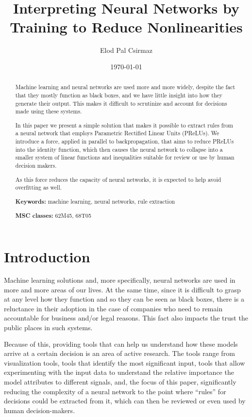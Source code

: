 \documentclass{article}[12pt]
\title{Interpreting Neural Networks by Training to Reduce Nonlinearities}
\author{Elod Pal Csirmaz\\
\texttt{\rot{\rot{maz.}{csir}{ep}com}{@}{elod}}}
\date{\today}
\newcommand{\myskip}{\bigskip\noindent}
\begin{document}
\maketitle

\begin{abstract}
Machine learning and neural networks are used more and more widely,
despite the fact that they mostly function as black boxes, and we
have little insight into how they generate their output.
This makes it difficult to scrutinize and account for decisions made using these systems.

In this paper we present a simple solution that makes it possible to
extract rules from a neural network that employs Parametric Rectified Linear Units (PReLUs).
We introduce a force, applied in parallel to backpropagation, that
aims to reduce PReLUs into the identity function, which then causes
the neural network to collapse into a smaller system of linear functions and inequalities
suitable for review or use by human decision makers.

As this force reduces the capacity of neural networks, it is expected to help avoid overfitting as well.

\myskip
{\bf Keywords:} %
machine learning,
neural networks,
rule extraction

\myskip
{\bf MSC classes:} %
62M45,  %
68T05   %


\end{abstract}

\section{Introduction}

Machine learning solutions and, more specifically, neural networks are used
in more and more areas of our lives. At the same time, since it is difficult to 
grasp at any level how they function and so they can be seen as black boxes,
there is a reluctance in their adoption in the case of companies who need to
remain accountable for business and/or legal reasons. This fact also impacts
the trust the public places in such systems.

Because of this, providing tools that can help us understand how these
models arrive at a certain decision is an area of active research.
The tools range from visualization tools, tools that identify the
most significant input, tools that allow experimenting with the input data
to understand the relative importance the model attributes to different
signals, and, the focus of this paper, significantly reducing the complexity
of a neural network to the point where ``rules'' for decisions could be
extracted from it, which can then be reviewed or even used by human decision-makers.
\end{document}
